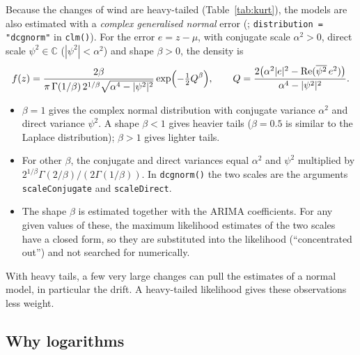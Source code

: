 \documentclass[11pt,a4paper]{article}
\newcommand{\code}[1]{\texttt{#1}}
\renewcommand{\Re}{\operatorname{Re}}
\begin{document}
Because the changes of wind are heavy-tailed (Table~\ref{tab:kurt}), the models are also
estimated with a \emph{complex generalised normal} error (\citealp{novey2010};
\code{distribution = "dcgnorm"} in \code{clm()}). For the error $e = z - \mu$, with conjugate
scale $\alpha^2 > 0$, direct scale $\psi^2 \in \mathbb{C}$ ($|\psi^2| < \alpha^2$) and shape
$\beta > 0$, the density is
\begin{equation}\label{eq:cgnorm}
  f(z) = \frac{2\beta}{\pi\,\Gamma(1/\beta)\, 2^{1/\beta}\sqrt{\alpha^4 - |\psi^2|^2}}
         \exp\Bigl(-\tfrac12 Q^\beta\Bigr),
  \qquad
  Q = \frac{2\bigl(\alpha^2|e|^2 - \Re(\overline{\psi^2}\, e^2)\bigr)}{\alpha^4 - |\psi^2|^2}.
\end{equation}
\begin{itemize}
  \item $\beta = 1$ gives the complex normal distribution with conjugate variance $\alpha^2$ and
    direct variance $\psi^2$. A shape $\beta < 1$ gives heavier tails ($\beta = 0.5$ is similar to
    the Laplace distribution); $\beta > 1$ gives lighter tails.
  \item For other $\beta$, the conjugate and direct variances equal $\alpha^2$ and $\psi^2$
    multiplied by $2^{1/\beta}\Gamma(2/\beta) / (2\Gamma(1/\beta))$. In \code{dcgnorm()} the two scales
    are the arguments \code{scaleConjugate} and \code{scaleDirect}.
  \item The shape $\beta$ is estimated together with the ARIMA coefficients. For any given values
    of these, the maximum likelihood estimates of the two scales have a closed form, so
    they are substituted into the likelihood (``concentrated out'') and not searched for
    numerically.
\end{itemize}
With heavy tails, a few very large changes can pull the estimates of a normal model, in
particular the drift. A heavy-tailed likelihood gives these observations less weight.

\subsection{Why logarithms}\label{sec:log}
\end{document}
